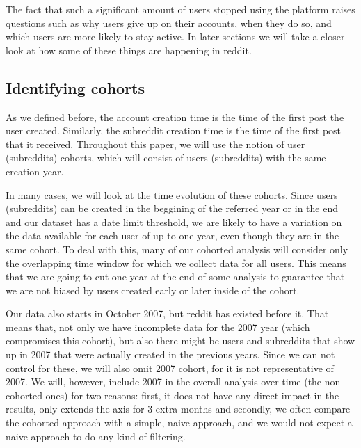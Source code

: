 The fact that such a significant amount of users stopped using the platform raises questions such as why users give up on their accounts, when they do so, and which users are more likely to stay active. In later sections we will take a closer look at how some of these things are happening in reddit.

\subsection{Identifying cohorts}

As we defined before, the account creation time is the time of the first post the user created. Similarly, the subreddit creation time is the time of the first post that it received. Throughout this paper, we will use the notion of user (subreddits) cohorts, which will consist of users (subreddits) with the same creation year.

In many cases, we will look at the time evolution of these cohorts. Since users (subreddits) can be created in the beggining of the referred year or in the end and our dataset has a date limit threshold, we are likely to have a variation on the data available for each user of up to one year, even though they are in the same cohort. To deal with this, many of our cohorted analysis will consider only the overlapping time window for which we collect data for all users. This means that we are going to cut one year at the end of some analysis to guarantee that we are not biased by users created early or later inside of the cohort.

Our data also starts in October 2007, but reddit has existed before it. That means that, not only we have incomplete data for the 2007 year (which compromises this cohort), but also there might be users and subreddits that show up in 2007 that were actually created in the previous years. Since we can not control for these, we will also omit 2007 cohort, for it is not representative of 2007. We will, however, include 2007 in the overall analysis over time (the non cohorted ones) for two reasons: first, it does not have any direct impact in the results, only extends the axis for 3 extra months and secondly, we often compare the cohorted approach with a simple, naive approach, and we would not expect a naive approach to do any kind of filtering.